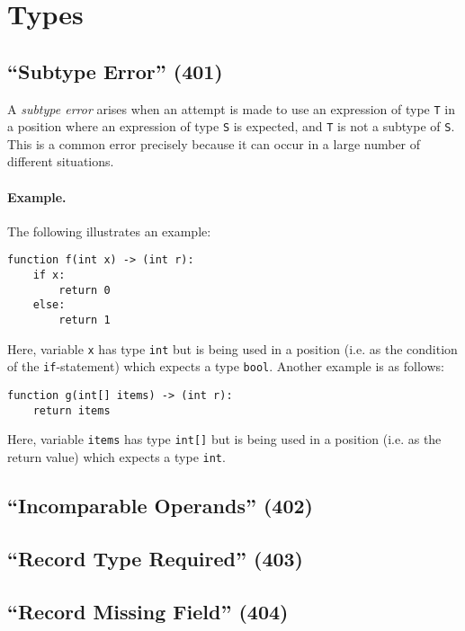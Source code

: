 \section{Types}
\label{c_err_types}

\subsection{``Subtype Error'' (401)}

A {\em subtype error} arises when an attempt is made to use an expression of type \lstinline{T} in a position where an expression of type \lstinline{S} is expected, and \lstinline{T} is not a subtype of \lstinline{S}.  This is a common error precisely because it can occur in a large number of different situations.

\paragraph{Example.}  The following illustrates an example:

\begin{lstlisting}
function f(int x) -> (int r):
    if x:
        return 0
    else:
        return 1
\end{lstlisting}

Here, variable \lstinline{x} has type \lstinline{int} but is being used in a position (i.e. as the condition of the \lstinline{if}-statement) which expects a type \lstinline{bool}.  Another example is as follows:

\begin{lstlisting}
function g(int[] items) -> (int r):
    return items
\end{lstlisting}

Here, variable \lstinline{items} has type \lstinline{int[]} but is being used in a position (i.e. as the return value) which expects a type \lstinline{int}.

\subsection{``Incomparable Operands'' (402)}

\subsection{``Record Type Required'' (403)}

\subsection{``Record Missing Field'' (404)}



